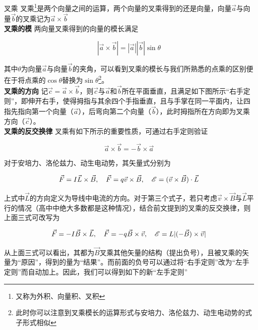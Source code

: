 \begin{defi}[label=d_cc]{叉乘}{}
叉乘\footnote{又称为外积、向量积、叉积}是两个向量之间的运算，两个向量的叉乘得到的还是向量，向量$\vec{a}$与向量$\vec{b}$的叉乘记为$\vec{a} \times \vec{b}$
~\\

\textbf{叉乘的模}  \quad 两向量叉乘得到的向量的模长满足

$$ | \vec{a} \times \vec{b} | = | \vec{a} | | \vec{b} | \sin \theta$$

其中$\theta$为向量$\vec{a}$与向量$\vec{b}$的夹角，可以看到叉乘的模长与我们所熟悉的点乘的区别便在于将点乘的$\cos \theta$替换为$\sin \theta$\footnote{此时你可以注意到叉乘模长的运算形式与安培力、洛伦兹力、动生电动势的式子形式相似}。
~\\

\textbf{叉乘的方向} \quad 记$\vec{c} = \vec{a} \times \vec{b}$，则$\vec{c}$与$\vec{a}$和$\vec{b}$所在平面垂直，且满足如下图所示“右手定则”，即伸开右手，使得拇指与其余四个手指垂直，且与手掌在同一平面内，让四指先指向第一个向量（$\vec{a}$），后弯向第二个向量（$\vec{b}$），此时拇指所在方向即为叉乘方向（$\vec{c}$）。
~\\

\textbf{叉乘的反交换律} \quad 叉乘有如下所示的重要性质，可通过右手定则验证

$$\vec{a} \times \vec{b} = - \vec{b} \times \vec{a}$$

\end{defi}

对于安培力、洛伦兹力、动生电动势，其矢量式分别为

$$\vec{F} = I \vec{L} \times \vec{B}, \quad \vec{F} = q \vec{v} \times \vec{B}, \quad \mathscr{E} = (\vec{v} \times \vec{B}) \cdot \vec{L}$$

上式中$\vec{L}$的方向定义为导线中电流的方向。对于第三个式子，若只考虑$\vec{v} \times \vec{B}$与$\vec{L}$平行的情况（高中中绝大多数都是这种情况），结合前文提到的叉乘的反交换律，则上面三式可改写为

$$\vec{F} = - I \vec{B} \times \vec{L}, \quad \vec{F} = - q \vec{B} \times \vec{v}, \quad \mathscr{E} = L | (- \vec{B}) \times \vec{v} |$$

从上面三式可以看出，其都为$\vec{B}$叉乘其他矢量的结构（提出负号），且被叉乘的矢量为“原因”，得到的量为“结果”。而前面的负号可以通过将“右手定则”改为“左手定则”而自动加上。因此，我们可以得到如下的新“左手定则”

